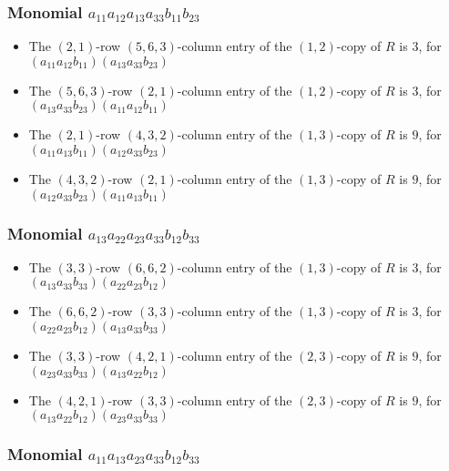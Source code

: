 \documentclass{article}
\begin{document}
\subsubsection{Monomial $ a_{11} a_{12} a_{13} a_{33} b_{11} b_{23} $}

\begin{itemize}
\item The $(2, 1)$-row $(5, 6, 3)$-column entry of the $ \left(1, 2\right) $-copy of $R$ is $ 3 $, for $( a_{11} a_{12} b_{11} )( a_{13} a_{33} b_{23} )$ 
\item The $(5, 6, 3)$-row $(2, 1)$-column entry of the $ \left(1, 2\right) $-copy of $R$ is $ 3 $, for $( a_{13} a_{33} b_{23} )( a_{11} a_{12} b_{11} )$ 
\item The $(2, 1)$-row $(4, 3, 2)$-column entry of the $ \left(1, 3\right) $-copy of $R$ is $ 9 $, for $( a_{11} a_{13} b_{11} )( a_{12} a_{33} b_{23} )$ 
\item The $(4, 3, 2)$-row $(2, 1)$-column entry of the $ \left(1, 3\right) $-copy of $R$ is $ 9 $, for $( a_{12} a_{33} b_{23} )( a_{11} a_{13} b_{11} )$ 
\end{itemize}
\subsubsection{Monomial $ a_{13} a_{22} a_{23} a_{33} b_{12} b_{33} $}

\begin{itemize}
\item The $(3, 3)$-row $(6, 6, 2)$-column entry of the $ \left(1, 3\right) $-copy of $R$ is $ 3 $, for $( a_{13} a_{33} b_{33} )( a_{22} a_{23} b_{12} )$ 
\item The $(6, 6, 2)$-row $(3, 3)$-column entry of the $ \left(1, 3\right) $-copy of $R$ is $ 3 $, for $( a_{22} a_{23} b_{12} )( a_{13} a_{33} b_{33} )$ 
\item The $(3, 3)$-row $(4, 2, 1)$-column entry of the $ \left(2, 3\right) $-copy of $R$ is $ 9 $, for $( a_{23} a_{33} b_{33} )( a_{13} a_{22} b_{12} )$ 
\item The $(4, 2, 1)$-row $(3, 3)$-column entry of the $ \left(2, 3\right) $-copy of $R$ is $ 9 $, for $( a_{13} a_{22} b_{12} )( a_{23} a_{33} b_{33} )$ 
\end{itemize}
\subsubsection{Monomial $ a_{11} a_{13} a_{23} a_{33} b_{12} b_{33} $}
\end{document}
